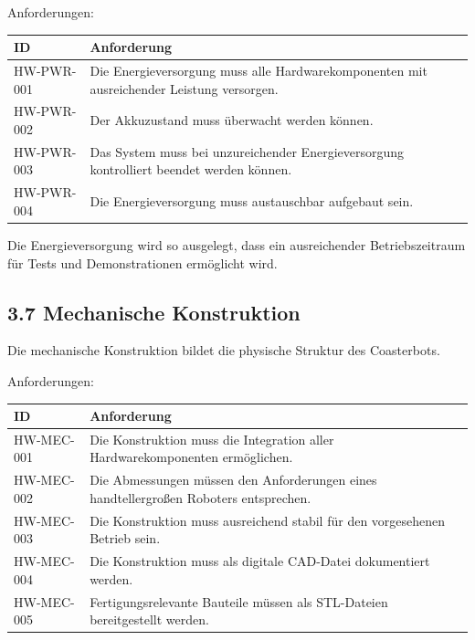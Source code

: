 \documentclass[
]{article}
\begin{document}
Anforderungen:

\begin{longtable}[]{@{}
  >{\raggedright\arraybackslash}p{}
  >{\raggedright\arraybackslash}p{}@{}}
\toprule\noalign{}
\begin{minipage}[b]{\linewidth}\raggedright
ID
\end{minipage} & \begin{minipage}[b]{\linewidth}\raggedright
Anforderung
\end{minipage} \\
\midrule\noalign{}
\endhead
\bottomrule\noalign{}
\endlastfoot
HW-PWR-001 & Die Energieversorgung muss alle Hardwarekomponenten mit
ausreichender Leistung versorgen. \\
HW-PWR-002 & Der Akkuzustand muss überwacht werden können. \\
HW-PWR-003 & Das System muss bei unzureichender Energieversorgung
kontrolliert beendet werden können. \\
HW-PWR-004 & Die Energieversorgung muss austauschbar aufgebaut sein. \\
\end{longtable}

Die Energieversorgung wird so ausgelegt, dass ein ausreichender
Betriebszeitraum für Tests und Demonstrationen ermöglicht wird.

\subsection{3.7 Mechanische
Konstruktion}\label{mechanische-konstruktion}

Die mechanische Konstruktion bildet die physische Struktur des
Coasterbots.

Anforderungen:

\begin{longtable}[]{@{}
  >{\raggedright\arraybackslash}p{}
  >{\raggedright\arraybackslash}p{}@{}}
\toprule\noalign{}
\begin{minipage}[b]{\linewidth}\raggedright
ID
\end{minipage} & \begin{minipage}[b]{\linewidth}\raggedright
Anforderung
\end{minipage} \\
\midrule\noalign{}
\endhead
\bottomrule\noalign{}
\endlastfoot
HW-MEC-001 & Die Konstruktion muss die Integration aller
Hardwarekomponenten ermöglichen. \\
HW-MEC-002 & Die Abmessungen müssen den Anforderungen eines
handtellergroßen Roboters entsprechen. \\
HW-MEC-003 & Die Konstruktion muss ausreichend stabil für den
vorgesehenen Betrieb sein. \\
HW-MEC-004 & Die Konstruktion muss als digitale CAD-Datei dokumentiert
werden. \\
HW-MEC-005 & Fertigungsrelevante Bauteile müssen als STL-Dateien
bereitgestellt werden. \\
\end{longtable}
\end{document}

